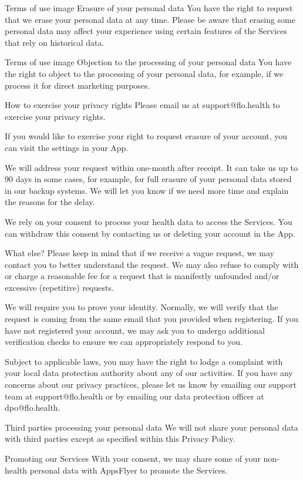 Terms of use image
Erasure of your personal data
You have the right to request that we erase your personal data at any time. Please be aware that erasing some personal data may affect your experience using certain features of the Services that rely on historical data.

Terms of use image
Objection to the processing of your personal data
You have the right to object to the processing of your personal data, for example, if we process it for direct marketing purposes.

How to exercise your privacy rights
Please email us at support@flo.health to exercise your privacy rights. 

If you would like to exercise your right to request erasure of your account, you can visit the settings in your App. 

We will address your request within one-month after receipt. It can take us up to 90 days in some cases, for example, for full erasure of your personal data stored in our backup systems. We will let you know if we need more time and explain the reasons for the delay. 

We rely on your consent to process your health data to access the Services. You can withdraw this consent by contacting us or deleting your account in the App.

What else?
Please keep in mind that if we receive a vague request, we may contact you to better understand the request. We may also refuse to comply with or charge a reasonable fee for a request that is manifestly unfounded and/or excessive (repetitive) requests. 

We will require you to prove your identity. Normally, we will verify that the request is coming from the same email that you provided when registering. If you have not registered your account, we may ask you to undergo additional verification checks to ensure we can appropriately respond to you. 

Subject to applicable laws, you may have the right to lodge a complaint with your local data protection authority about any of our activities. If you have any concerns about our privacy practices, please let us know by emailing our support team at support@flo.health or by emailing our data protection officer at dpo@flo.health.

Third parties processing your personal data
We will not share your personal data with third parties except as specified within this Privacy Policy.

Promoting our Services
With your consent, we may share some of your non-health personal data with AppsFlyer to promote the Services. 


